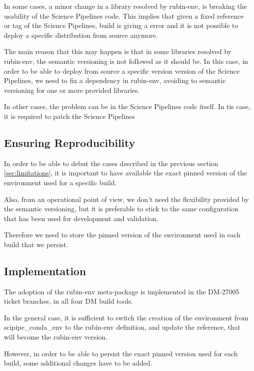 \documentclass[DM,authoryear,toc]{lsstdoc}
\begin{document}
In some cases, a minor change in a library resolved by rubin-env, is breaking the usability
of the Science Pipelines code.
This implies that given a fixed reference or tag of the Science Pipelines, build is giving a error and 
it is not possible to deploy a specific distribution from source anymore.

The main reason that this may happen is that in some libraries resolved by rubin-env,
the semantic versioning is not followed as it should be. 
In this case, in order to be able to deploy from source a specific version version of the Science Pipelines,
we need to fix a dependency in rubin-env, avoiding to semantic versioning for one or more provided libraries.

In other cases, the problem can be in the Science Pipelines code itself.
In tis case, it is required to patch the Science Pipelines


\subsection{Ensuring Reproducibility} \label{sec:reproducibility}

In order to be able to debut the cases described in the previous section \ref{sec:limitations},
it is important to have available the exact pinned version of the environment used for a specific build.

Also, from an operational point of view, we don't need the flexibility provided by the semantic versioning,
but it is preferable to stick to the same configuration that has been used for development and validation.

Therefore we need to store the pinned version of the environment used in each build that we persist.


\subsection{Implementation} \label{sec:implementation}

The adoption of the rubin-env meta-package is implemented in the DM-27005 ticket branches,
in all four DM build tools. 

In the general case, it is sufficient to switch the creation of the environment from scipipe\_conda\_env
to the rubin-env definition, and update the reference, that will become the rubin-env version.

However, in order to be able to persist the exact pinned version used for each build, some additional changes have to be added.
\end{document}
